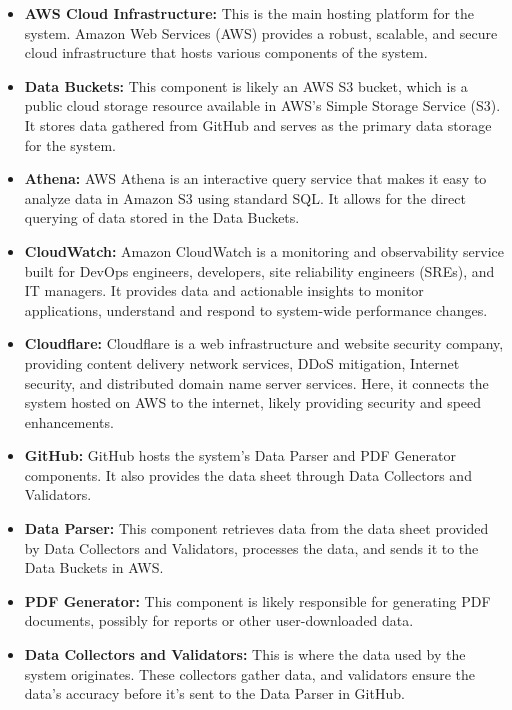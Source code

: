 \documentclass[12pt, letterpaper]{article}
\begin{document}
\begin{itemize}
    \item \textbf{AWS Cloud Infrastructure:} This is the main hosting platform for the system. Amazon Web Services (AWS) provides a robust, scalable, and secure cloud infrastructure that hosts various components of the system.
    
    \item \textbf{Data Buckets:} This component is likely an AWS S3 bucket, which is a public cloud storage resource available in AWS's Simple Storage Service (S3). It stores data gathered from GitHub and serves as the primary data storage for the system.
    
    \item \textbf{Athena:} AWS Athena is an interactive query service that makes it easy to analyze data in Amazon S3 using standard SQL. It allows for the direct querying of data stored in the Data Buckets.
    
    \item \textbf{CloudWatch:} Amazon CloudWatch is a monitoring and observability service built for DevOps engineers, developers, site reliability engineers (SREs), and IT managers. It provides data and actionable insights to monitor applications, understand and respond to system-wide performance changes.
    
    \item \textbf{Cloudflare:} Cloudflare is a web infrastructure and website security company, providing content delivery network services, DDoS mitigation, Internet security, and distributed domain name server services. Here, it connects the system hosted on AWS to the internet, likely providing security and speed enhancements.
    
    \item \textbf{GitHub:} GitHub hosts the system's Data Parser and PDF Generator components. It also provides the data sheet through Data Collectors and Validators.
    
    \item \textbf{Data Parser:} This component retrieves data from the data sheet provided by Data Collectors and Validators, processes the data, and sends it to the Data Buckets in AWS.
    
    \item \textbf{PDF Generator:} This component is likely responsible for generating PDF documents, possibly for reports or other user-downloaded data.
    
    \item \textbf{Data Collectors and Validators:} This is where the data used by the system originates. These collectors gather data, and validators ensure the data's accuracy before it's sent to the Data Parser in GitHub.
\end{itemize}
\end{document}

